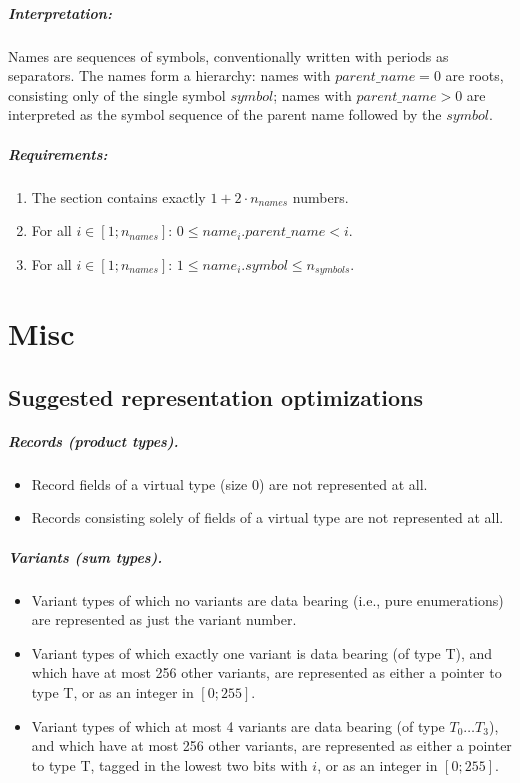 \documentclass[a4paper]{report}
\begin{document}
\paragraph{Interpretation:}
Names are sequences of symbols, conventionally written with periods as
separators. The names form a hierarchy: names with $parent\_name = 0$
are roots, consisting only of the single symbol $symbol$; names with
$parent\_name > 0$ are interpreted as the symbol sequence of the
parent name followed by the $symbol$.

\paragraph{Requirements:}
\begin{enumerate}
\item The section contains exactly $1 + 2 \cdot n_{names}$ numbers.
\item For all $i \in [1;n_{names}]$: $0 \le name_i.parent\_name < i$.
\item For all $i \in [1;n_{names}]$: $1 \le name_i.symbol \le n_{symbols}$.
\end{enumerate}



\chapter{Misc}

\section{Suggested representation optimizations}

\paragraph{Records (product types).}
\begin{itemize}
\item Record fields of a virtual type (size 0) are not represented at all.
\item Records consisting solely of fields of a virtual type are not represented at all.
\end{itemize}

\paragraph{Variants (sum types).}
\begin{itemize}
\item Variant types of which no variants are data bearing (i.e., pure enumerations) are represented as just the variant number.
\item Variant types of which exactly one variant is data bearing (of type T), and which have at most 256 other variants, are represented as either a pointer to type T, or as an integer in $[0;255]$.
\item Variant types of which at most 4 variants are data bearing (of type $T_0\ldots T_3$), and which have at most 256 other variants, are represented as either a pointer to type T, tagged in the lowest two bits with $i$, or as an integer in $[0;255]$.
\end{itemize}
\end{document}
